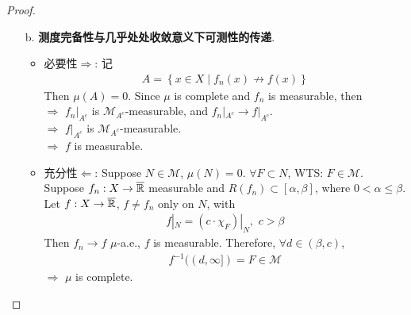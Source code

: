 \begin{enumerate}
\begin{proof}
\begin{enumerate}
				\newpage
				
				\item[b.] \textbf{测度完备性与几乎处处收敛意义下可测性的传递}. \\
				\begin{itemize}
					\item 必要性$\Rightarrow$: 记
					\begin{align}
						A = \left\{ x \in X \mid f_{n}(x) \not\to f(x) \right\}
					\end{align}
					Then $\mu(A) = 0$. Since $\mu$ is complete and $f_n$ is measurable, then \\
					$\Rightarrow \,\, f_{n}|_{A^c}$ is $\mathcal{M}_{A^c}$-measurable, and $f_{n}|_{A^c} \to f|_{A^c}$. \\
					$\Rightarrow \,\, f|_{A^c}$ is $\mathcal{M}_{A^c}$-measurable. \\
					$\Rightarrow \,\, f$ is measurable.
					
					\vspace*{12em}
					
					\item 充分性$\Leftarrow$: Suppose $N \in \mathcal{M}$, $\mu(N) = 0$. $\forall F \subset N$, WTS: $F \in \mathcal{M}$. \\
					Suppose $f_n : X \rightarrow \overline{\mathbb{R}}$ measurable and $R(f_n) \subset [\alpha , \beta]$, where $0 < \alpha \leq \beta$. \\
					Let $f : X \rightarrow \overline{\mathbb{R}}$, $f \neq f_n$ only on $N$, with
					\begin{align}
						f|_{N} = (c \cdot \chi_{F})|_{N} , \,\, c > \beta
					\end{align}
					Then $f_n \to f \,\, \mu$-a.e., $f$ is measurable. Therefore, $\forall d \in (\beta , c)$, 
					\begin{align}
						f^{-1}((d , \infty]) = F \in \mathcal{M}
					\end{align}
					$\Rightarrow \,\, \mu$ is complete.
				\end{itemize}
			\end{enumerate}
		\end{proof}
	\end{enumerate}
	

	\ifx\allfiles\undefined

\fi